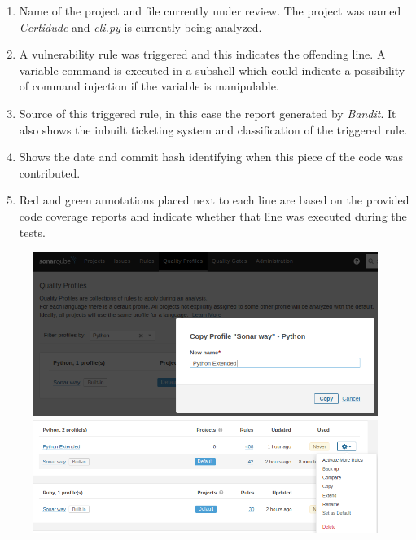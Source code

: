 \begin{enumerate}
    \item Name of the project and file currently under review. The project was named \textit{Certidude} and \textit{cli.py} is currently being analyzed.
    \item A vulnerability rule was triggered and this indicates the offending line. A variable command is executed in a subshell which could indicate a possibility of command injection if the variable is manipulable.
    \item Source of this triggered rule, in this case the report generated by \textit{Bandit}. It also shows the inbuilt ticketing system and classification of the triggered rule.
    \item Shows the date and commit hash identifying when this piece of the code was contributed.
    \item Red and green annotations placed next to each line are based on the provided code coverage reports and indicate whether that line was executed during the tests. 
\end{enumerate}

\begin{figure}[!htb]
    \centering
    \begin{minipage}{.5\textwidth}
        \centering
        \includegraphics[width=.95\linewidth]{figures/screenshots/sonar-profile.png}
    \end{minipage}%
    \begin{minipage}{0.5\textwidth}
        \centering
        \includegraphics[width=.95\linewidth]{figures/screenshots/sonar-python-profile.png}
    \end{minipage}
    \label{fig:sonarqube-profiles}
\end{figure}

